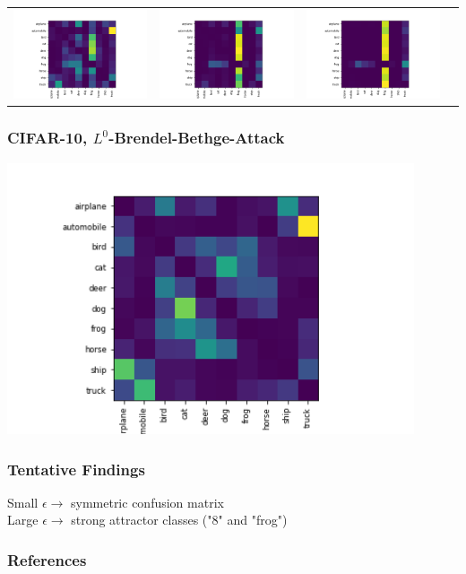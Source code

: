 \documentclass[10pt,usepdftitle=false,aspectratio=169]{beamer}
\begin{document}
\begin{frame}
\begin{tabular}{cccc}
		\includegraphics[align=c,width=0.3\columnwidth]{../code/results/CIFAR-10/figures/LinfPGD, epsilon=0.2.png} &
		\includegraphics[align=c,width=0.3\columnwidth]{../code/results/CIFAR-10/figures/LinfPGD, epsilon=0.5.png} &
		\includegraphics[align=c,width=0.3\columnwidth]{../code/results/CIFAR-10/figures/LinfPGD, epsilon=1.png} &
	\end{tabular}
\end{frame}

\begin{frame}
	\frametitle{CIFAR-10, $L^0$-Brendel-Bethge-Attack}
		
		\includegraphics[align=c,width=0.9\textwidth]{../code/results/CIFAR-10/figures/L0BrendelBethgeAttack.png}
\end{frame}

\begin{frame}
	\frametitle{Tentative Findings}
	
	\large
	Small $\epsilon \rightarrow$ symmetric confusion matrix \\
	\medskip
	Large $\epsilon \rightarrow$ strong attractor classes ("8" and "frog")
\end{frame}

\begin{frame}[allowframebreaks]
	\frametitle{References}
	
	
\end{frame}
\end{document}
